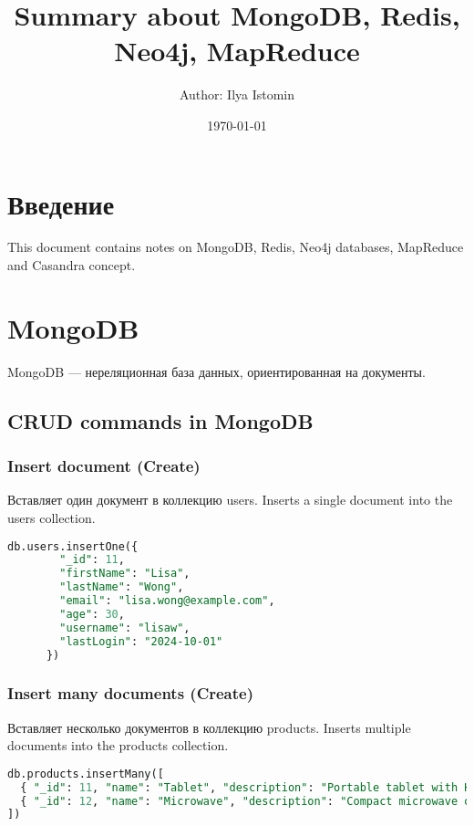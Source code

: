 \documentclass[a4paper,12pt]{article}
\title{Summary about MongoDB, Redis, Neo4j, MapReduce}
\author{Author: Ilya Istomin}
\date{\today}
\begin{document}
\maketitle

\section{Введение}
This document contains notes on MongoDB, Redis, Neo4j databases, MapReduce and Casandra concept.



\section{MongoDB}
MongoDB — нереляционная база данных, ориентированная на документы.

\subsection{CRUD commands in MongoDB}
\subsubsection{Insert document (Create)}
Вставляет один документ в коллекцию users.
\newline
Inserts a single document into the users collection.

\begin{lstlisting}[language=SQL]
    db.users.insertOne({
        "_id": 11,
        "firstName": "Lisa",
        "lastName": "Wong",
        "email": "lisa.wong@example.com",
        "age": 30,
        "username": "lisaw",
        "lastLogin": "2024-10-01"
      })

\end{lstlisting}

\subsubsection{Insert many documents (Create)}
Вставляет несколько документов в коллекцию products.
\newline
Inserts multiple documents into the products collection.
\begin{lstlisting}[language=SQL]
db.products.insertMany([
  { "_id": 11, "name": "Tablet", "description": "Portable tablet with HD screen", "price": 600, "category": "Electronics" },
  { "_id": 12, "name": "Microwave", "description": "Compact microwave oven", "price": 90, "category": "Home Appliances" }
])
\end{lstlisting}
\end{document}
